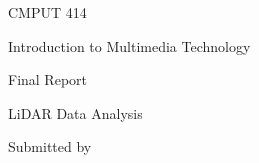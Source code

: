 \documentclass[12pt]{report}
\begin{document}
\begin{Center}
CMPUT 414 
\end{Center}\par

\begin{Center}
Introduction to Multimedia Technology
\end{Center}\par


\vspace{\baselineskip}

\vspace{\baselineskip}

\vspace{\baselineskip}

\vspace{\baselineskip}

\vspace{\baselineskip}

\vspace{\baselineskip}

\vspace{\baselineskip}

\vspace{\baselineskip}

\vspace{\baselineskip}
\begin{Center}
Final Report
\end{Center}\par

\begin{Center}
LiDAR Data Analysis
\end{Center}\par


\vspace{\baselineskip}

\vspace{\baselineskip}

\vspace{\baselineskip}

\vspace{\baselineskip}

\vspace{\baselineskip}

\vspace{\baselineskip}

\vspace{\baselineskip}

\vspace{\baselineskip}

\vspace{\baselineskip}
\begin{Center}
Submitted by
\end{Center}\par
\end{document}
